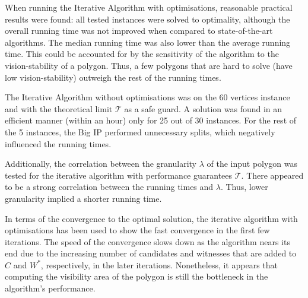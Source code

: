 When running the Iterative Algorithm with optimisations, reasonable practical results were found: all tested instances were solved to optimality, although the overall running time was not improved when compared to state-of-the-art algorithms. The median running time was also lower than the average running time. This could be accounted for by the sensitivity of the algorithm to the vision-stability of a polygon. Thus, a few polygons that are hard to solve (have low vision-stability) outweigh the rest of the running times.

The Iterative Algorithm without optimisations was on the 60 vertices instance and with the theoretical limit $\mathcal T$ as a safe guard. A solution was found in an efficient manner (within an hour) only for 25 out of 30 instances. For the rest of the 5 instances, the Big IP performed unnecessary splits, which negatively influenced the running times.

Additionally, the correlation between the granularity $\lambda$ of the input polygon was tested for the iterative algorithm with performance guarantees $\mathcal T$. There appeared to be a strong correlation between the running times and $\lambda$. Thus, lower granularity implied a shorter running time.

In terms of the convergence to the optimal solution, the iterative algorithm with optimisations has been used to show the fast convergence in the first few iterations. The speed of the convergence slows down as the algorithm nears its end due to the increasing number of candidates and witnesses that are added to $C$ and $W^*$, respectively, in the later iterations. Nonetheless, it appears that computing the visibility area of the polygon is still the bottleneck in the algorithm's performance.



